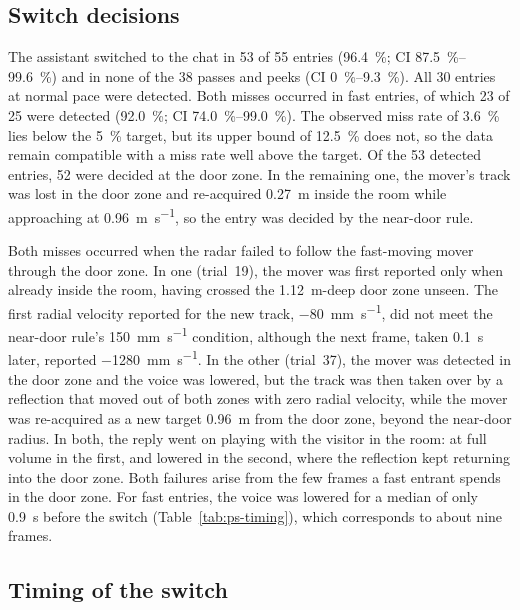 \subsection{Switch decisions}
\label{sec:ps-switch}

The assistant switched to the chat in 53 of 55 entries (\SI{96.4}{\percent};
CI \SIrange{87.5}{99.6}{\percent}) and in none of the 38 passes and peeks
(CI \SIrange{0}{9.3}{\percent}). All 30 entries at normal pace were detected.
Both misses occurred in fast entries, of which 23 of 25 were detected
(\SI{92.0}{\percent}; CI \SIrange{74.0}{99.0}{\percent}). The observed miss
rate of \SI{3.6}{\percent} lies below the \SI{5}{\percent} target, but its
upper bound of \SI{12.5}{\percent} does not, so the data remain compatible with
a miss rate well above the target. Of the 53 detected entries, 52 were decided
at the door zone. In the remaining one, the mover's track was lost in the door
zone and re-acquired \SI{0.27}{\metre} inside the room while approaching at
\SI{0.96}{\metre\per\second}, so the entry was decided by the near-door rule.

Both misses occurred when the radar failed to follow the fast-moving mover
through the door zone. In one (trial~19), the mover was first reported only
when already inside the room, having crossed the \SI{1.12}{\metre}-deep door
zone unseen. The first radial velocity reported for the new track,
\SI{-80}{\milli\metre\per\second}, did not meet the near-door rule's
\SI{150}{\milli\metre\per\second} condition, although the next frame, taken
\SI{0.1}{\second} later, reported \SI{-1280}{\milli\metre\per\second}. In the
other (trial~37), the mover was detected in the door zone and the voice was
lowered, but the track was then taken over by a reflection that moved out of
both zones with zero radial velocity, while the mover was re-acquired as a new
target \SI{0.96}{\metre} from the door zone, beyond the near-door radius. In
both, the reply went on playing with the visitor in the room: at full volume in
the first, and lowered in the second, where the reflection kept returning into
the door zone. Both failures arise from the few frames a fast entrant spends
in the door zone. For fast entries, the voice was lowered for a median of only
\SI{0.9}{\second} before the switch (Table~\ref{tab:ps-timing}), which
corresponds to about nine frames.

\subsection{Timing of the switch}
\label{sec:ps-timing}

